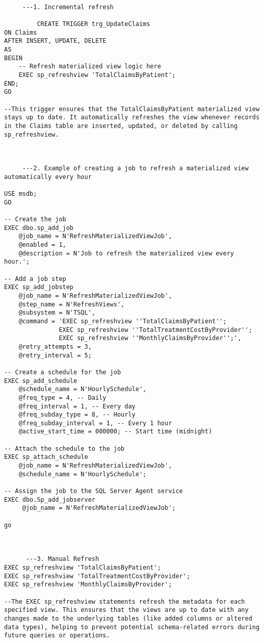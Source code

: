          \begin{lstlisting}[style=sqlstyle, caption={Maintenance and Refresh Strategies}, label=lst:Maintenance_and_Refresh_Strategies]

     ---1. Incremental refresh 
     
         CREATE TRIGGER trg_UpdateClaims
ON Claims
AFTER INSERT, UPDATE, DELETE
AS
BEGIN
    -- Refresh materialized view logic here
    EXEC sp_refreshview 'TotalClaimsByPatient';
END;
GO

--This trigger ensures that the TotalClaimsByPatient materialized view stays up to date. It automatically refreshes the view whenever records in the Claims table are inserted, updated, or deleted by calling sp_refreshview.



     ---2. Example of creating a job to refresh a materialized view automatically every hour

USE msdb;
GO

-- Create the job
EXEC dbo.sp_add_job
    @job_name = N'RefreshMaterializedViewJob',
    @enabled = 1,
    @description = N'Job to refresh the materialized view every hour.';

-- Add a job step
EXEC sp_add_jobstep
    @job_name = N'RefreshMaterializedViewJob',
    @step_name = N'RefreshViews',
    @subsystem = N'TSQL',
    @command = 'EXEC sp_refreshview ''TotalClaimsByPatient'';
               EXEC sp_refreshview ''TotalTreatmentCostByProvider'';
               EXEC sp_refreshview ''MonthlyClaimsByProvider'';',
    @retry_attempts = 3,
    @retry_interval = 5;

-- Create a schedule for the job
EXEC sp_add_schedule
    @schedule_name = N'HourlySchedule',
    @freq_type = 4, -- Daily
    @freq_interval = 1, -- Every day
    @freq_subday_type = 8, -- Hourly
    @freq_subday_interval = 1, -- Every 1 hour
    @active_start_time = 000000; -- Start time (midnight)

-- Attach the schedule to the job
EXEC sp_attach_schedule
    @job_name = N'RefreshMaterializedViewJob',
    @schedule_name = N'HourlySchedule';

-- Assign the job to the SQL Server Agent service
EXEC dbo.Sp_add_jobserver
     @job_name = N'RefreshMaterializedViewJob';

go 



      ---3. Manual Refresh
EXEC sp_refreshview 'TotalClaimsByPatient';
EXEC sp_refreshview 'TotalTreatmentCostByProvider';
EXEC sp_refreshview 'MonthlyClaimsByProvider';

--The EXEC sp_refreshview statements refresh the metadata for each specified view. This ensures that the views are up to date with any changes made to the underlying tables (like added columns or altered data types), helping to prevent potential schema-related errors during future queries or operations.
        \end{lstlisting}